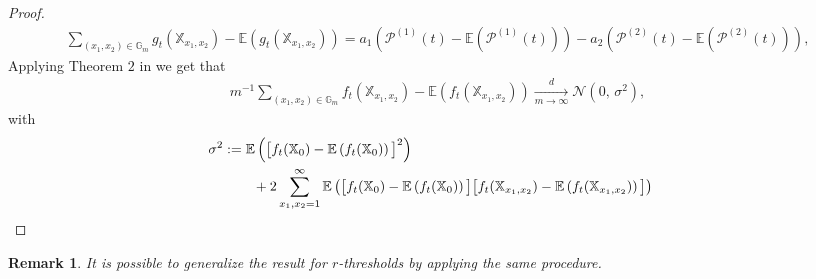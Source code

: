 \documentclass[12pt]{article}
\theoremstyle{Theorem}
\newtheorem{remark}{Remark}
\begin{document}
\begin{proof}
\begin{align*}
\sum_{(x_1, x_2) \in \mathbb{G}_{m}} g_{t}\left(\mathbb{X}_{x_1, x_2}\right) - \mathbb{E}\left(g_{t}\left(\mathbb{X}_{x_1, x_2}\right)\right) = a_{1}\left(\mathcal{P}^{\scriptscriptstyle (1)}(t) - \mathbb{E}\left(\mathcal{P}^{\scriptscriptstyle (1)}(t)\right)\right) - a_{2}\left(\mathcal{P}^{\scriptscriptstyle (2)}(t) - \mathbb{E}\left(\mathcal{P}^{\scriptscriptstyle (2)}(t)\right)\right),
\end{align*}
Applying Theorem $2$ in \cite{arcones} we get that 
\begin{align*}
m^{-1} \sum_{(x_1, x_2) \in \mathbb{G}_{m}} f_{\scriptscriptstyle t}\left(\mathbb{X}_{x_1, x_2}\right) - \mathbb{E}\left(f_{\scriptscriptstyle t}\left(\mathbb{X}_{x_1, x_2}\right)\right) \xrightarrow[m \to \infty]{d} \mathcal{N}\left(0,\,\sigma^{2}\right),
\end{align*}
with 
\begin{align*}
\sigma^{2} := \mathbb{E}\left(\big[f_{t}(\mathbb{X}_{0}) - \mathbb{E}\left(f_{t}(\mathbb{X}_{0})\right)\big]^{2}\right) \\
& \hspace{-4cm}+ 2 \sum_{x_{1}, x_{2} = 1}^{\infty} \mathbb{E}\left(\big[f_{t}(\mathbb{X}_{0}) - \mathbb{E}\left(f_{t}(\mathbb{X}_{0})\right)\big]\big[f_{t}(\mathbb{X}_{x_1,x_2}) - \mathbb{E}\left(f_{t}(\mathbb{X}_{x_1, x_2})\right)\big]\right)
\end{align*}
\end{proof}
\begin{remark}
It is possible to generalize the result for $r$-thresholds by applying the same procedure.
\end{remark}
\end{document}
